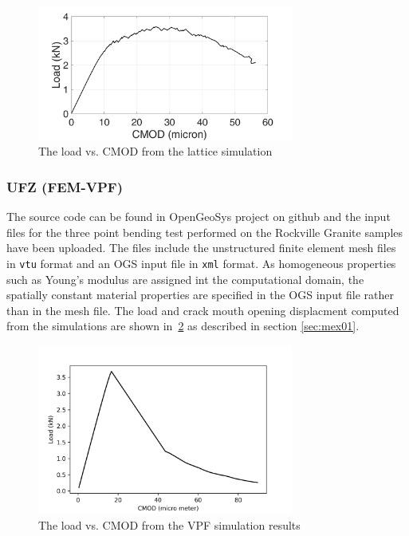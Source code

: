 \begin{figure}[!ht]
\centering
\includegraphics[width=0.75\textwidth]{figures/Amir_ME1_LEM_Displacement_Crystalline_Data.png}
\caption{The load vs. CMOD from the lattice simulation}
\label{fig:Amir_ME1_LEM_Displacement_Crystalline_Data}
\end{figure}

\subsubsection*{UFZ (FEM-VPF)}
The source code can be found in OpenGeoSys project on github and  the input files for the three point bending test performed on the Rockville Granite samples have been uploaded.
The files include the unstructured finite element mesh files in \texttt{vtu} format and an OGS input file in \texttt{xml} format.
As homogeneous properties such as Young's modulus are assigned int the computational domain, the spatially constant material properties are specified in the OGS input file rather than in the mesh file.
The load and crack mouth opening displacment computed from the simulations are shown in~\ref{fig:Keita_ME1_VPF_Rockville} as described in section \ref {sec:mex01}.

\begin{figure}[!ht]
\centering
\includegraphics[width=0.75\textwidth]{figures/VPF_ME1_NF_CMOD.png}
\caption{The load vs. CMOD from the VPF simulation results}
\label{fig:Keita_ME1_VPF_Rockville}
\end{figure}

